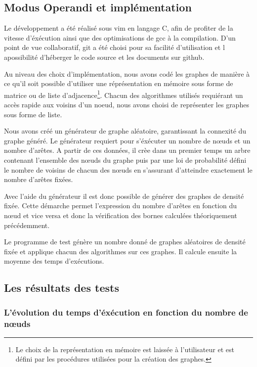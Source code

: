 \subsection{Modus Operandi et implémentation}

Le développement a été réalisé sous vim en langage C, afin de profiter de la vitesse d'éxécution
ainsi que des optimisations de gcc à la compilation. D'un point de vue collaboratif, git a été
choisi pour sa facilité d'utilisation et l apossibilité d'héberger le code source et les documents
sur github.

Au niveau des choix d'implémentation, nous avons codé les graphes de manière à ce qu'il soit
possible d'utiliser une réprésentation en mémoire sous forme de matrice ou de liste
d'adjacence\footnote{Le choix de la représentation en mémoire est laissée à l'utilisateur et est
défini par les procédures utilisées pour la création des graphes.}. Chacun des algorithmes utilisés
requiérant un accès rapide aux voisins d'un noeud, nous avons choisi de représenter les graphes sous
forme de liste.

Nous avons créé un générateur de graphe aléatoire, garantissant la connexité du graphe généré. Le
générateur requiert pour s'éxécuter un nombre de n\oe uds et un nombre d'arêtes. A partir de ces
données, il crèe dans un premier temps un arbre contenant l'ensemble des n\oe uds du graphe puis par
une loi de probabilité défini le nombre de voisins de chacun des n\oe uds en s'assurant d'atteindre
exactement le nombre d'arêtes fixées.

Avec l'aide du générateur il est donc possible de générer des graphes de densité fixée. Cette
démarche permet l'expression du nombre d'arêtes en fonction du n\oe ud et vice versa et donc la
vérification des bornes calculées théoriquement précédemment.

Le programme de test génère un nombre donné de graphes aléatoires de densité fixée et applique
chacun des algorithmes sur ces graphes. Il calcule ensuite la moyenne des temps d'exécutions.

\subsection{Les résultats des tests}

\subsubsection{L'évolution du temps d'éxécution en fonction du nombre de n\oe uds}


